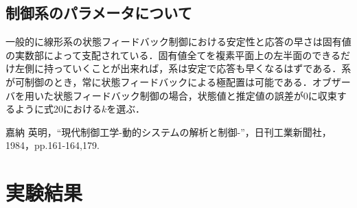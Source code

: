 \documentclass[11pt,a4paper]{jsarticle}
\begin{document}
\subsection{制御系のパラメータについて}
一般的に線形系の状態フィードバック制御における安定性と応答の早さは固有値の実数部によって支配されている．固有値全てを複素平面上の左半面のできるだけ左側に持っていくことが出来れば，系は安定で応答も早くなるはずである．系が可制御のとき，常に状態フィードバックによる極配置は可能である．オブザーバを用いた状態フィードバック制御の場合，状態値と推定値の誤差が0に収束するように式20における$k$を選ぶ．

\begin{thebibliography}{1}
  嘉納 英明，``現代制御工学-動的システムの解析と制御-''，日刊工業新聞社，1984，pp.161-164,179.
\end{thebibliography}

\newpage
\setcounter{page}{1}
\setcounter{section}{4}
\pagestyle{fancy}
\renewcommand{\headrulewidth}{0.0pt}
\lhead{}
\cfoot{}

\section{実験結果}
\end{document}
